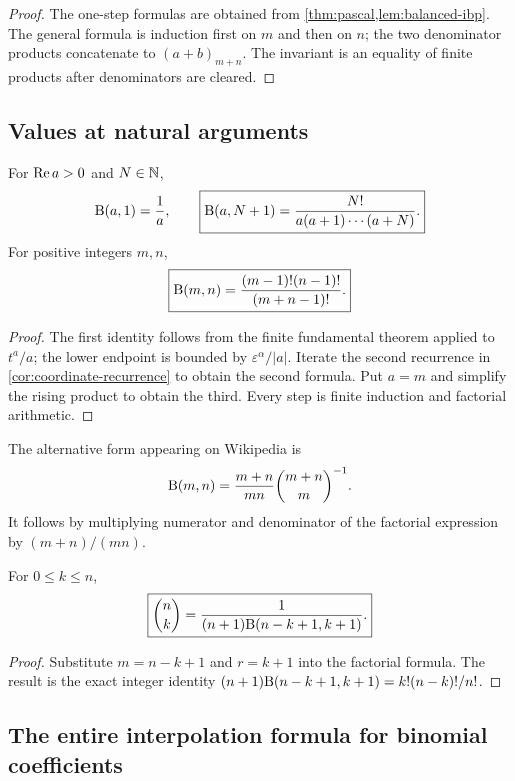 \begin{proof}
The one-step formulas are obtained from \cref{thm:pascal,lem:balanced-ibp}.  The general formula is induction first on $m$ and then on $n$; the two denominator products concatenate to $(a+b)_{m+n}$.  The invariant is an equality of finite products after denominators are cleared.
\end{proof}

\subsection{Values at natural arguments}

\begin{theorem}\label{thm:integer-values}
For $\operatorname{Re} a>0$ and $N\in\mathbb N$,
\[
 \mathrm B(a,1)=\frac1a,
 \qquad
 \boxed{\mathrm B(a,N+1)=\frac{N!}{a(a+1)\cdots(a+N)}.}
\]
For positive integers $m,n$,
\[
 \boxed{\mathrm B(m,n)=\frac{(m-1)!(n-1)!}{(m+n-1)!}.}
\]
\end{theorem}

\begin{proof}
The first identity follows from the finite fundamental theorem applied to $t^a/a$; the lower endpoint is bounded by $\varepsilon^\alpha/|a|$.  Iterate the second recurrence in \cref{cor:coordinate-recurrence} to obtain the second formula.  Put $a=m$ and simplify the rising product to obtain the third.  Every step is finite induction and factorial arithmetic.
\end{proof}

The alternative form appearing on Wikipedia is
\[
 \mathrm B(m,n)=\frac{m+n}{mn}\binom{m+n}{m}^{-1}.
\]
It follows by multiplying numerator and denominator of the factorial expression by $(m+n)/(mn)$.

\begin{corollary}\label{cor:binomial-beta}
For $0\le k\le n$,
\[
 \boxed{\binom nk=\frac{1}{(n+1)\mathrm B(n-k+1,k+1)}.}
\]
\end{corollary}

\begin{proof}
Substitute $m=n-k+1$ and $r=k+1$ into the factorial formula.  The result is the exact integer identity
$(n+1)\mathrm B(n-k+1,k+1)=k!(n-k)!/n!$.
\end{proof}

\subsection{The entire interpolation formula for binomial coefficients}

